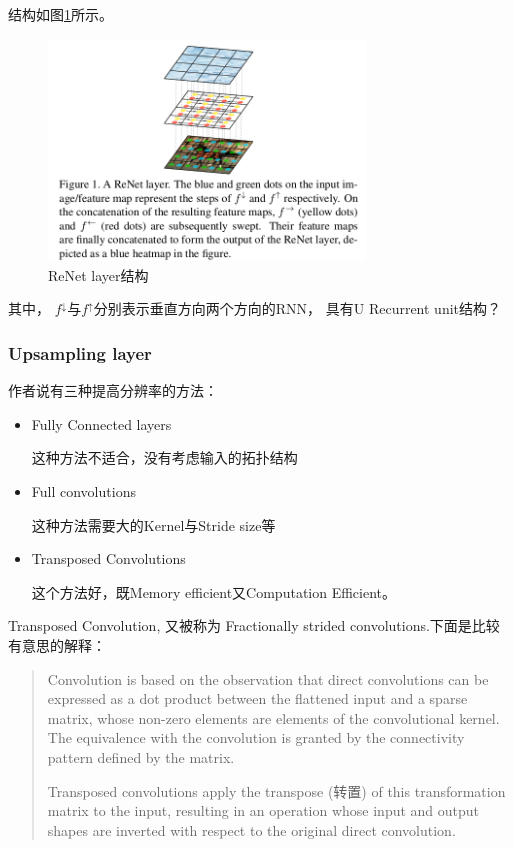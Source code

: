 结构如图\ref{ReSeg0}所示。

\begin{figure}[!hbtp]
\centering
\includegraphics[width=0.75\textwidth]{SemanticSLAM/ReSeg0.png}
\caption{ReNet layer结构}
\label{ReSeg0}
\end{figure}

其中， $f^{\downarrow}$与$f^{\uparrow}$分别表示垂直方向两个方向的RNN， 具有U Recurrent unit结构？



\subsubsection{Upsampling layer}

作者说有三种提高分辨率的方法：
\begin{itemize}
\item Fully Connected layers

这种方法不适合，没有考虑输入的拓扑结构

\item Full convolutions

这种方法需要大的Kernel与Stride size等

\item Transposed Convolutions

这个方法好，既Memory efficient又Computation Efficient。

\end{itemize}

Transposed Convolution, 又被称为 Fractionally strided convolutions.下面是比较有意思的解释：
\begin{quote}
Convolution is based
on the observation that direct convolutions can be expressed
as a dot product between the flattened input and a sparse
matrix, whose non-zero elements are elements of the convolutional kernel. The equivalence with the convolution is
granted by the connectivity pattern defined by the matrix.

Transposed convolutions apply the transpose (转置) of this
transformation matrix to the input, resulting in an operation whose input and output shapes are inverted with respect to the original direct convolution.
\end{quote}


